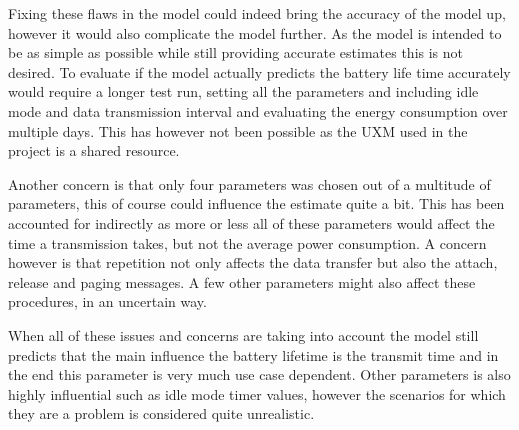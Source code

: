 Fixing these flaws in the model could indeed bring the accuracy of the model up, however it would also complicate the model further. As the model is intended to be as simple as possible while still providing accurate estimates this is not desired. To evaluate if the model actually predicts the battery life time accurately would require a longer test run, setting all the parameters and including idle mode and data transmission interval and evaluating the energy consumption over multiple days. This has however not been possible as the UXM used in the project is a shared resource. 

Another concern is that only four parameters was chosen out of a multitude of parameters, this of course could influence the estimate quite a bit. This has been accounted for indirectly as more or less all of these parameters would affect the time a transmission takes, but not the average power consumption. A concern however is that repetition not only affects the data transfer but also the attach, release and paging messages. A few other parameters might also affect these procedures, in an uncertain way.

When all of these issues and concerns are taking into account the model still predicts that the main influence the battery lifetime is the transmit time and in the end this parameter is very much use case dependent. Other parameters is also highly influential such as idle mode timer values, however the scenarios for which they are a problem is considered quite unrealistic. 

